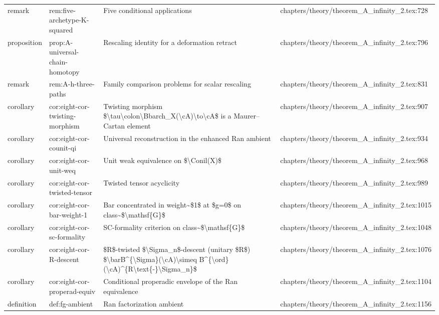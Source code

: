 \documentclass[11pt]{article}
\begin{document}
\begin{longtable}{L{0.10\textwidth}L{0.26\textwidth}L{0.42\textwidth}L{0.22\textwidth}}
remark & rem:five-archetype-K-squared & Five cond{}itional applications & chapters/theory/theorem\_A\_infinity\_2.tex:728\\
proposition & prop:A-universal-chain-homotopy & Rescaling identity for a deformation retract & chapters/theory/theorem\_A\_infinity\_2.tex:796\\
remark & rem:A-h-three-paths & Family comparison problems for scalar rescaling & chapters/theory/theorem\_A\_infinity\_2.tex:831\\
corollary & cor:eight-cor-twisting-morphism & Twisting morphism \$\textbackslash{}tau\textbackslash{}colon\textbackslash{}Bbarch\_X(\textbackslash{}cA)\textbackslash{}to\textbackslash{}cA\$ is a Maurer--Cartan element & chapters/theory/theorem\_A\_infinity\_2.tex:907\\
corollary & cor:eight-cor-counit-qi & Universal reconstruction in the enhanced Ran ambient & chapters/theory/theorem\_A\_infinity\_2.tex:934\\
corollary & cor:eight-cor-unit-weq & Unit weak equivalence on \$\textbackslash{}Conil(X)\$ & chapters/theory/theorem\_A\_infinity\_2.tex:968\\
corollary & cor:eight-cor-twisted-tensor & Twisted tensor acyclicity & chapters/theory/theorem\_A\_infinity\_2.tex:989\\
corollary & cor:eight-cor-bar-weight-1 & Bar concentrated in weight\textasciitilde{}\$1\$ at \$g=0\$ on class\textasciitilde{}\$\textbackslash{}mathsf\{G\}\$ & chapters/theory/theorem\_A\_infinity\_2.tex:1015\\
corollary & cor:eight-cor-sc-formality & SC-formality criterion on class\textasciitilde{}\$\textbackslash{}mathsf\{G\}\$ & chapters/theory/theorem\_A\_infinity\_2.tex:1048\\
corollary & cor:eight-cor-R-descent & \$R\$-twisted \$\textbackslash{}Sigma\_n\$-descent (unitary \$R\$) \$\textbackslash{}barB\textasciicircum{}\{\textbackslash{}Sigma\}(\textbackslash{}cA)\textbackslash{}simeq B\textasciicircum{}\{\textbackslash{}ord\}(\textbackslash{}cA)\textasciicircum{}\{R\textbackslash{}text\{-\}\textbackslash{}Sigma\_n\}\$ & chapters/theory/theorem\_A\_infinity\_2.tex:1076\\
corollary & cor:eight-cor-properad-equiv & Cond{}itional properadic envelope of the Ran equivalence & chapters/theory/theorem\_A\_infinity\_2.tex:1104\\
definition & def:fg-ambient & Ran factorization ambient & chapters/theory/theorem\_A\_infinity\_2.tex:1156\\

\end{longtable}
\end{document}
